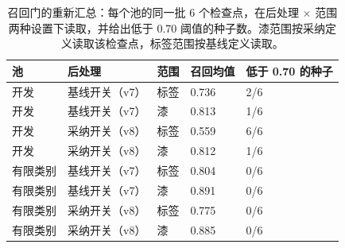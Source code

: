 \documentclass[journal]{IEEEtran}
\begin{document}
\begin{table}[!t]
\centering
\caption{召回门的重新汇总：每个池的同一批 6 个检查点，在后处理 $\times$ 范围两种设置下读取，并给出低于 0.70 阈值的种子数。漆范围按采纳定义读取该检查点，标签范围按基线定义读取。}
\begin{tabular}{@{}lllll@{}}
\toprule
池 & 后处理 & 范围 & 召回均值 & 低于 0.70 的种子 \\
\midrule
开发 & 基线开关（v7） & 标签 & 0.736 & 2/6 \\
开发 & 基线开关（v7） & 漆 & 0.813 & 1/6 \\
开发 & 采纳开关（v8） & 标签 & 0.559 & 6/6 \\
开发 & 采纳开关（v8） & 漆 & 0.812 & 1/6 \\
有限类别 & 基线开关（v7） & 标签 & 0.804 & 0/6 \\
有限类别 & 基线开关（v7） & 漆 & 0.891 & 0/6 \\
有限类别 & 采纳开关（v8） & 标签 & 0.775 & 0/6 \\
有限类别 & 采纳开关（v8） & 漆 & 0.885 & 0/6 \\
\bottomrule
\end{tabular}
\end{table}
\end{document}
